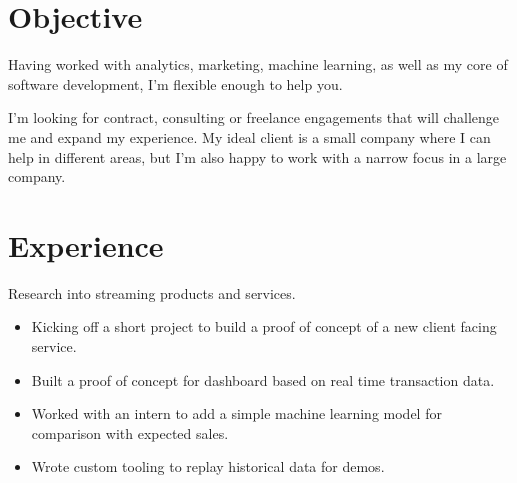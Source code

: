 \documentclass[11pt,a4paper,sans]{moderncv}        %
\begin{document}
\makecvtitle

\section{Objective}
Having worked with analytics, marketing, machine learning, as well as my core of software development, I'm flexible enough to help you.

I'm looking for contract, consulting or freelance engagements that will challenge me and expand my experience.
My ideal client is a small company where I can help in different areas, but I'm also happy to work with a narrow focus in a large company.

\section{Experience}
{Research into streaming products and services.
\newline{}
\begin{itemize}
\item Kicking off a short project to build a proof of concept of a new client facing service.
\item Built a proof of concept for dashboard based on real time transaction data.
\item Worked with an intern to add a simple machine learning model for comparison with expected sales.
\item Wrote custom tooling to replay historical data for demos.
\end{itemize}
}
\end{document}
